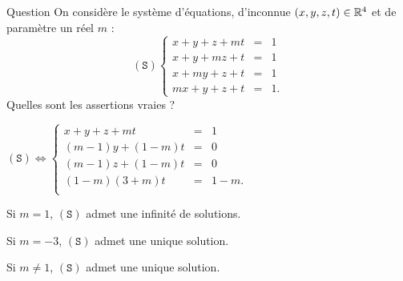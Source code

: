 \begin{multi}[multiple,feedback=
{\[(\mathtt{S}) \Leftrightarrow  
\left\{\begin{array}{rcc}
x+y+z+mt&=&1\\
(m-1)y+(1-m)t&=&0\\ 
(m-1)z+(1-m)t&=&0 \\
(1-m)y+(1-m)z+(1-m^2)t&=&1-m\\
\end{array}\right.
\]
\[\Leftrightarrow  
\left\{\begin{array}{rcc}
x+y+z+mt&=&1\\
(m-1)y+(1-m)t&=&0\\ 
(m-1)z+(1-m)t&=&0 \\
(1-m)(3+m)t&=&1-m. \\
\end{array}\right. \]
\begin{enumerate}
\item[-]Si \(m=1\), \((\mathtt{S}) \Leftrightarrow  x+y+z+t=1 \) admet une infinité de solutions.
\item[-]Si \(m=-3\), \((\mathtt{S})\) n'admet pas de solution.
\item[-]Si \(m\neq 1\) et \(m\neq -3\) \((\mathtt{S})\) admet une unique solution.
\end{enumerate}
}]{Question}
On considère le système d'équations, d'inconnue \((x,y,z,t)\in \mathbb{R}^4\)  et de paramètre un réel  \(m\) : 
\[(\mathtt{S})  
\left\{\begin{array}{rcc}
x+y+z+mt&=&1 \\
x+y+mz+t&=&1\\
x+my+z+t&=&1\\ 
mx+y+z+t&=&1.\end{array}\right.\]
Quelles sont les assertions vraies ?

    \item* \((\mathtt{S}) \Leftrightarrow
\left\{\begin{array}{rcc}
x+y+z+mt&=&1\\
(m-1)y+(1-m)t&=&0\\
(m-1)z+(1-m)t&=&0\\
(1-m)(3+m)t&=&1-m. \\
\end{array}\right.\)
    \item* Si \(m=1\), \((\mathtt{S})\) admet une infinité de solutions.
    \item Si \(m =-3\), \((\mathtt{S})\) admet une unique solution.
    \item Si \(m\neq 1\), \((\mathtt{S})\) admet une unique solution.
\end{multi}


